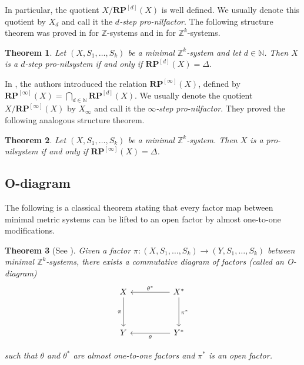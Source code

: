 \documentclass[11pt,reqno]{amsart}
\newcommand{\Z}{\mathbb{Z}}
\newcommand{\N}{\mathbb{N}}
\newcommand{\RP}{\mathbf{RP}}
\newtheorem{theorem}{Theorem}[section]
\theoremstyle{definition}
\theoremstyle{remark}
\begin{document}
In particular, the quotient $X/\RP^{[d]}(X)$ is well defined. We usually denote this quotient by $X_d$ and call it the {\em $d$-step pro-nilfactor}. The following structure theorem was proved in \cite{Host_Kra_Maass_nilstructure:2010} for $\mathbb{Z}$-systems and in \cite{Gutman_Manners_Varju_nilspaces_III:2020} for $\mathbb{Z}^k$-systems.

\begin{theorem}
    Let $(X,S_1,\dots,S_k)$ be a minimal $\Z^{k}$-system and let $d\in\N$. Then $X$ is a $d$-step pro-nilsystem if and only if $\RP^{[d]}(X)=\Delta$.
\end{theorem}

In \cite{Dong_Donoso_Maass_Shao_Ye_infinite_step_nil:2013}, the authors introduced the relation $\RP^{[\infty]}(X)$, defined by $\RP^{[\infty]}(X) = \bigcap_{d\in\N} \RP^{[d]}(X)$. We usually denote the quotient $X/\RP^{[\infty]}(X)$ by $X_\infty$ and call it the {\em $\infty$-step pro-nilfactor}. They proved the following analogous structure theorem.

\begin{theorem}\label{thm: str_thm}
    Let $(X,S_1,\dots,S_k)$ be a minimal $\Z^{k}$-system. Then $X$ is a pro-nilsystem if and only if $\RP^{[\infty]}(X)=\Delta$.
\end{theorem}

\subsection{O-diagram}

The following is a classical theorem stating that every factor map between minimal metric systems can be lifted to an open factor by almost one-to-one modifications.

\begin{theorem}[See {\cite[Chapter VI]{deVries_elements_topological_dynamics:1993}}]\label{thm: AG_diagram}
    Given a factor $\pi\colon (X, S_1,\dots,S_k) \to (Y, S_1,\dots,S_k)$ between minimal $\Z^k$-systems, there exists a commutative diagram of factors (called an O-diagram)
    \[\begin{tikzcd}
	X && {X^*} \\
	\\
	{Y} && {Y^*}
	\arrow["\pi"', from=1-1, to=3-1]
	\arrow["{\theta^*}"', from=1-3, to=1-1]
	\arrow["{\pi^*}", from=1-3, to=3-3]
	\arrow["\theta", from=3-3, to=3-1]
\end{tikzcd}\]

    such that $\theta$ and $\theta^*$ are almost one-to-one factors and $\pi^*$ is an open factor.
\end{theorem}
\end{document}
